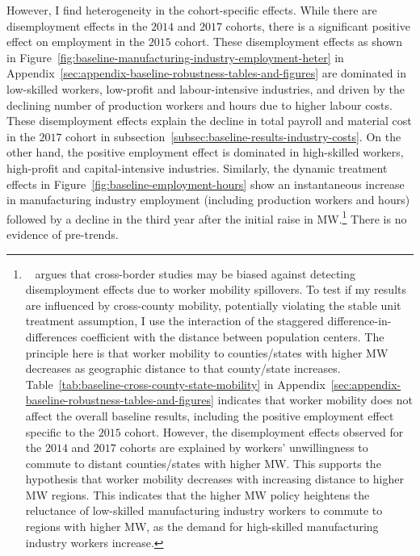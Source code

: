\documentclass{C:/Users/david/OneDrive/Documents/ULMS/PhD/Thesis/chapter3/src/climate_change/latex/Economic_Journal/OUP-EJ}
\begin{document}
    However, I find heterogeneity in the cohort-specific effects. While there are disemployment effects in the $2014$ and $2017$ cohorts, there is a significant positive effect on employment in the $2015$ cohort. These disemployment effects as shown in Figure~\ref{fig:baseline-manufacturing-industry-employment-heter} in Appendix~\ref{sec:appendix-baseline-robustness-tables-and-figures} are dominated in low-skilled workers, low-profit and labour-intensive industries, and driven by the declining number of production workers and hours due to higher labour costs. These disemployment effects explain the decline in total payroll and material cost in the $2017$ cohort in subsection~\ref{subsec:baseline-results-industry-costs}. On the other hand, the positive employment effect is dominated in high-skilled workers, high-profit and capital-intensive industries. Similarly, the dynamic treatment effects in Figure~\ref{fig:baseline-employment-hours} show an instantaneous increase in manufacturing industry employment (including production workers and hours) followed by a decline in the third year after the initial raise in MW.\footnote{\tiny~\citet{neumark2019econometrics} argues that cross-border studies may be biased against detecting disemployment effects due to worker mobility spillovers. To test if my results are influenced by cross-county mobility, potentially violating the stable unit treatment assumption, I use the interaction of the staggered difference-in-differences coefficient with the distance between population centers. The principle here is that worker mobility to counties/states with higher MW decreases as geographic distance to that county/state increases. Table~\ref{tab:baseline-cross-county-state-mobility} in Appendix~\ref{sec:appendix-baseline-robustness-tables-and-figures} indicates that worker mobility does not affect the overall baseline results, including the positive employment effect specific to the $2015$ cohort. However, the disemployment effects observed for the $2014$ and $2017$ cohorts are explained by workers' unwillingness to commute to distant counties/states with higher MW. This supports the hypothesis that worker mobility decreases with increasing distance to higher MW regions. This indicates that the higher MW policy heightens the reluctance of low-skilled manufacturing industry workers to commute to regions with higher MW, as the demand for high-skilled manufacturing industry workers increase.} There is no evidence of pre-trends.
    
\end{document}
